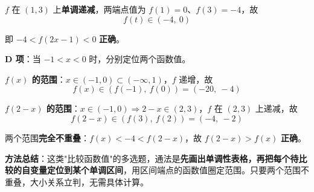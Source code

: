 \begin{answer}
$f$ 在 $(1,3)$ 上\textbf{单调递减}，两端点值为 $f(1)=0$、$f(3)=-4$，故
\nopagebreak[4]
\[f(t)\in(-4,\ 0)\]

即 $-4<f(2x-1)<0$  \textbf{正确}。

\par\medskip

\textbf{D 项}：当 $-1<x<0$ 时，分别定位两个函数值。

\textbf{$f(x)$ 的范围}：$x\in(-1,0)\subset(-\infty,1)$，$f$ 递增，故
\nopagebreak[4]
\[f(x)\in\left(f(-1),\ f(0)\right)=(-20,\ -4)\]

\textbf{$f(2-x)$ 的范围}：$x\in(-1,0)\Rightarrow 2-x\in(2,3)$，$f$ 在 $(2,3)$ 上递减，故
\nopagebreak[4]
\[f(2-x)\in\left(f(3),\ f(2)\right)=(-4,\ -2)\]

两个范围\textbf{完全不重叠}：$f(x)<-4<f(2-x)$，故 $f(2-x)>f(x)$  \textbf{正确}。

\begin{gktip}
\textbf{方法总结}：这类"比较函数值"的多选题，通法是\textbf{先画出单调性表格，再把每个待比较的自变量定位到某个单调区间}，用区间端点的函数值圈定范围。只要两个范围不重叠，大小关系立判，无需具体计算。
\end{gktip}


\par\medskip

\end{answer}
